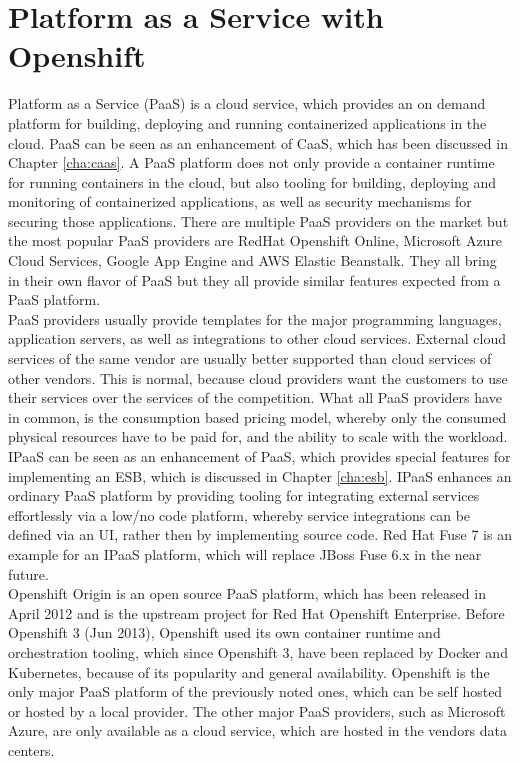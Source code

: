 \chapter{Platform as a Service with Openshift}
\label{cha:paas}
Platform as a Service (PaaS) is a cloud service, which provides an on demand platform for building, deploying and running containerized applications in the cloud. PaaS can be seen as an enhancement of CaaS, which has been discussed in Chapter \vref{cha:caas}. A PaaS platform does not only provide a container runtime for running containers in the cloud, but also tooling for building, deploying and monitoring of containerized applications, as well as security mechanisms for securing those applications. There are multiple PaaS providers on the market but the most popular PaaS providers are RedHat Openshift Online, Microsoft Azure Cloud Services, Google App Engine and AWS Elastic Beanstalk. They all bring in their own flavor of PaaS but they all provide similar features expected from a PaaS platform\cite{OpenshiftOnline2018, MicrosoftAzueCloudServices2018, GoogleCloudAE2018, AmazonWebServicesEBT2018}. \\

PaaS providers usually provide templates for the major programming languages, application servers, as well as integrations to other cloud services. External cloud services of the same vendor are usually better supported than cloud services of other vendors. This is normal, because cloud providers want the customers to use their services over the services of the competition. What all PaaS providers have in common, is the consumption based pricing model, whereby only the consumed physical resources have to be paid for, and the ability to scale with the workload. \\ 

IPaaS can be seen as an enhancement of PaaS, which provides special features for implementing an ESB, which is discussed in Chapter \vref{cha:esb}. IPaaS enhances an ordinary PaaS platform by providing tooling for integrating external services effortlessly via a low/no code platform, whereby service integrations can be defined via an UI, rather then by implementing source code. Red Hat Fuse 7 is an example for an IPaaS platform, which will replace JBoss Fuse 6.x in the near future\cite{Fuse72018, iPaaSP12015, iPaaSP22015}. \\

Openshift Origin is an open source PaaS platform, which has been released in April 2012 and is the upstream project for Red Hat Openshift Enterprise. Before Openshift 3 (Jun 2013), Openshift used its own container runtime and orchestration tooling, which since Openshift 3, have been replaced by Docker and Kubernetes, because of its popularity and general availability. Openshift is the only major PaaS platform of the previously noted ones, which can be self hosted or hosted by a local provider. The other major PaaS providers, such as Microsoft Azure, are only available as a cloud service, which are hosted in the vendors data centers\cite{OpenshiftOriginGithub2018}.

